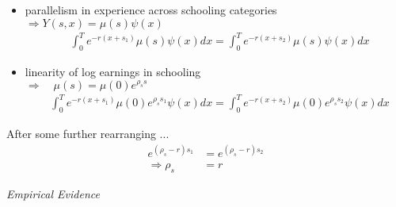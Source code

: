 \begin{frame}
\begin{itemize}
\item parallelism in experience across schooling categories \\\vspace{0.3cm}
\hspace{0.3cm}$\Rightarrow Y(s, x) = \mu(s)\psi(x)$\vspace{0.3cm}
\begin{align*}
&\int_{0}^T e^{-r(x + s_1)} \mu(s)\psi(x) dx  = \int_{0}^T e^{-r(x + s_2)} \mu(s)\psi(x)dx
\end{align*}
\end{itemize}
\end{frame}
\begin{frame}
\begin{itemize}
\item linearity of log earnings in schooling \\\vspace{0.3cm}
\hspace{0.3cm}$\Rightarrow\quad \mu(s) = \mu(0)e^{\rho_s s}$\vspace{0.3cm}
\begin{align*}
&\int_{0}^T e^{-r(x + s_1)} \mu(0)e^{\rho_s s_1}\psi(x) dx  = \int_{0}^T e^{-r(x + s_2)} \mu(0)e^{\rho_s s_2}\psi(x)dx
\end{align*}
\end{itemize}
\end{frame}
\begin{frame}
After some further rearranging ...
\begin{align*}
e^{(\rho_s - r)s_1} & = e^{(\rho_s - r) s_2} \\
\Rightarrow \rho_s  & = r
\end{align*}
\end{frame}
\begin{frame}\begin{center}
\LARGE\textit{Empirical Evidence}
\end{center}\end{frame}
